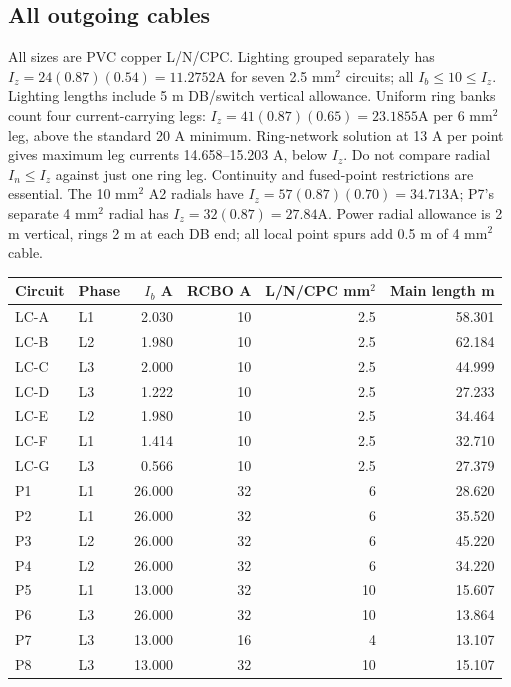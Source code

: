 \documentclass[11pt,a4paper]{article}
\begin{document}
\subsection*{All outgoing cables}
All sizes are PVC copper L/N/CPC. Lighting grouped separately has $I_z=24(0.87)(0.54)=11.2752$A for seven 2.5 mm$^2$ circuits;  all $I_b\le 10\le I_z$. Lighting lengths include 5 m DB/switch vertical allowance.
Uniform ring banks count four current-carrying legs: $I_z=41(0.87)(0.65)=23.1855$A per 6 mm$^2$ leg, above the standard 20 A minimum. Ring-network solution at 13 A per point gives maximum leg currents 14.658--15.203 A, below $I_z$. Do not compare radial $I_n\le I_z$ against just one ring leg. Continuity and fused-point restrictions are essential.
The 10 mm$^2$ A2 radials have $I_z=57(0.87)(0.70)=34.713$A;  P7's separate 4 mm$^2$ radial has $I_z=32(0.87)=27.84$A. Power radial allowance is 2 m vertical, rings 2 m at each DB end;  all local point spurs add 0.5 m of 4 mm$^2$ cable.
\begin{longtable}{llrrrr}\toprule
Circuit & Phase & $I_b$ A & RCBO A & L/N/CPC mm$^2$ & Main length m\\\midrule\endhead

LC-A & L1 & 2.030 & 10 & 2.5 & 58.301 \\
LC-B & L2 & 1.980 & 10 & 2.5 & 62.184 \\
LC-C & L3 & 2.000 & 10 & 2.5 & 44.999 \\
LC-D & L3 & 1.222 & 10 & 2.5 & 27.233 \\
LC-E & L2 & 1.980 & 10 & 2.5 & 34.464 \\
LC-F & L1 & 1.414 & 10 & 2.5 & 32.710 \\
LC-G & L3 & 0.566 & 10 & 2.5 & 27.379 \\
P1 & L1 & 26.000 & 32 & 6 & 28.620 \\
P2 & L1 & 26.000 & 32 & 6 & 35.520 \\
P3 & L2 & 26.000 & 32 & 6 & 45.220 \\
P4 & L2 & 26.000 & 32 & 6 & 34.220 \\
P5 & L1 & 13.000 & 32 & 10 & 15.607 \\
P6 & L3 & 26.000 & 32 & 10 & 13.864 \\
P7 & L3 & 13.000 & 16 & 4 & 13.107 \\
P8 & L3 & 13.000 & 32 & 10 & 15.107 \\

\bottomrule\end{longtable}
\end{document}
